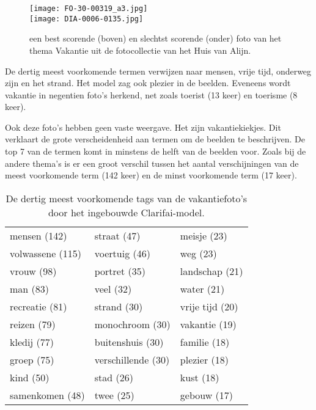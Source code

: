 \begin{figure}
	\centering
	\texttt{[image: FO-30-00319\_a3.jpg]}\hfill
	\\[\smallskipamount]
	\texttt{[image: DIA-0006-0135.jpg]}\hfill
	\caption[Best en slechtst scorende foto van thema Vakantie]{een best scorende (boven) en slechtst scorende (onder) foto van het thema Vakantie uit de fotocollectie van het Huis van Alijn.}
\end{figure}

De dertig meest voorkomende termen verwijzen naar mensen, vrije tijd, onderweg zijn en het strand. Het model zag ook plezier in de beelden. Eveneens wordt vakantie in negentien foto’s herkend, net zoals toerist (13 keer) en toerisme (8 keer).

Ook deze foto’s hebben geen vaste weergave. Het zijn vakantiekiekjes. Dit verklaart de grote verscheidenheid aan termen om de beelden te beschrijven. De top 7 van de termen komt in minstens de helft van de beelden voor. Zoals bij de andere thema’s is er een groot verschil tussen het aantal verschijningen van de meest voorkomende term (142 keer) en de minst voorkomende term (17 keer). 

\begin{table}
	\centering
	\begin{tabular}{*{3}{l}}
		mensen (142) & straat (47) & meisje (23) \\
		volwassene (115) & voertuig (46) & weg (23) \\
		vrouw (98) & portret (35) & landschap (21) \\
		man (83) & veel (32) & water (21) \\
		recreatie (81) & strand (30) & vrije tijd (20) \\
		reizen (79) & monochroom (30) & vakantie (19) \\
		kledij (77) & buitenshuis (30) & familie (18) \\
		groep (75) & verschillende (30) & plezier (18) \\
		kind (50) & stad (26) & kust (18) \\
		samenkomen (48) & twee (25) & gebouw (17) \\
	\end{tabular}
	\caption[Dertig meest voorkomende tags van vakantiefoto's door het ingebouwde model]{De dertig meest voorkomende tags van de vakantiefoto's door het ingebouwde Clarifai-model.}
	\label{tab:30-termen-vakantie}
\end{table}

